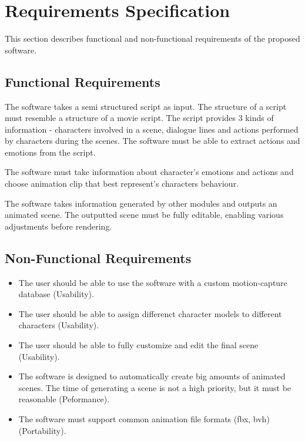 \chapter{Requirements Specification\label{chap:requirements}}

\noindent This section describes functional and non-functional requirements of the proposed software.


\section{Functional Requirements}


\noindent The software takes a semi structured script as input. The structure of a script must resemble a structure of a movie script. The script provides 3 kinds of information - characters involved in a scene, dialogue lines and actions performed by characters during the scenes. The software must be able to extract actions and emotions from the script.

\bigskip


\noindent The software must take information about character's emotions and actions and choose animation clip that best represent's characters behaviour.

\bigskip


\noindent The software takes information generated by other modules and outputs an animated scene. The outputted scene must be fully editable, enabling various adjustments before rendering.


\section{Non-Functional Requirements}

\begin{itemize}
\item The user should be able to use the software with a custom motion-capture database (Usability).
\item The user should be able to assign differenct character models to different characters (Usability).
\item The user should be able to fully customize and edit the final scene (Usability).
\item The software is designed to automatically create big amounts of animated scenes. The time of generating a scene is not a high priority, but it must be reasonable (Peformance).
\item The software must support common animation file formats (fbx, bvh) (Portability).
\end{itemize}
